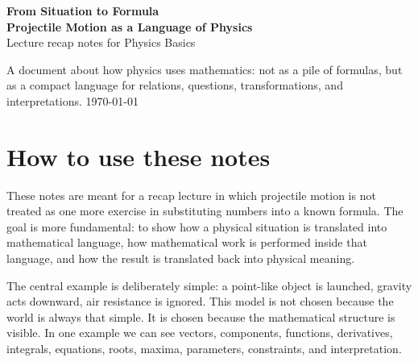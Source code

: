 \documentclass[11pt,a4paper]{article}
\newcommand{\vect}[1]{\boldsymbol{#1}}
\begin{document}
\begin{titlepage}
\centering
\vspace*{18mm}
{\Huge\bfseries\color{DeepBlue} From Situation to Formula\\[2mm]}
{\LARGE\bfseries Projectile Motion as a Language of Physics\\[8mm]}
{\Large Lecture recap notes for Physics Basics\\[15mm]}
\vfill
{\large A document about how physics uses mathematics: not as a pile of formulas, but as a compact language for relations, questions, transformations, and interpretations.}
\vfill
{\large \today}
\end{titlepage}

\tableofcontents
\newpage

\section*{How to use these notes}

These notes are meant for a recap lecture in which projectile motion is not treated as one more exercise in substituting numbers into a known formula. The goal is more fundamental: to show how a physical situation is translated into mathematical language, how mathematical work is performed inside that language, and how the result is translated back into physical meaning.

The central example is deliberately simple: a point-like object is launched, gravity acts downward, air resistance is ignored. This model is not chosen because the world is always that simple. It is chosen because the mathematical structure is visible. In one example we can see vectors, components, functions, derivatives, integrals, equations, roots, maxima, parameters, constraints, and interpretation.
\end{document}
